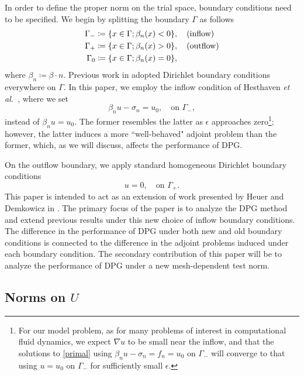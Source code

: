 \documentclass[11pt,onecolumn]{scrartcl}
\newcommand{\Gm}{\Gamma_{-}}
\newcommand{\Gp}{\Gamma_{+}}
\def\etal{{\it et al.~}}
\newcommand{\grad}{\nabla}
\begin{document}
In order to define the proper norm on the trial space, boundary
conditions need to be specified. We begin by splitting the boundary
$\Gamma$ as follows
\begin{align*}
\Gamma_{-} &\coloneqq \{x\in \Gamma; \beta_n(x) < 0\}, \quad {\rm
  (inflow)}\\ \Gamma_{+} &\coloneqq \{x\in \Gamma; \beta_n(x) > 0\},
\quad {\rm (outflow)}\\ \Gamma_{0} &\coloneqq \{x\in \Gamma;
\beta_n(x) = 0\},
\end{align*}
where $\beta_n \coloneqq \beta \cdot n$.
Previous work in \cite{DPGrobustness} adopted Dirichlet boundary
conditions everywhere on $\Gamma$.  
In this paper, we employ the inflow
condition of Hesthaven \etal \cite{Hesthaven96astable}, where we set
\[
\beta_n u - \sigma_n  = u_0, \quad \text{on } \Gm,
\]
instead of $\beta_n u = u_0$. The former resembles the latter
as $\epsilon$ approaches zero\footnote{For our model problem, as for many problems of interest in computational fluid dynamics, we expect $\grad u$ to be small near the inflow, and that the solutions to \eqref{primal} using $\beta_n u - \sigma_n = f_n = u_0$ on $\Gamma_-$ will converge to that using $u=u_0$ on $\Gamma_-$  for sufficiently small $\epsilon$.}; however, the latter induces a more ``well-behaved" adjoint problem than the former, which, as we will discuss, affects the performance of DPG. 

On the outflow boundary, we apply standard homogeneous Dirichlet boundary conditions
\[
u = 0, \quad \text{on } \Gp.
\]
This paper is intended to act as an extension of work presented by Heuer and Demkowicz in \cite{DPGrobustness}. The primary focus of the paper is to analyze the DPG method and extend previous results under this new choice of inflow boundary conditions. The difference in the performance of DPG under both new and old boundary conditions is connected to the difference in the adjoint problems induced under each boundary condition. The secondary contribution of this paper will be to analyze the performance of DPG under a new mesh-dependent test norm. 

\subsection{Norms on $U$}
\end{document}
